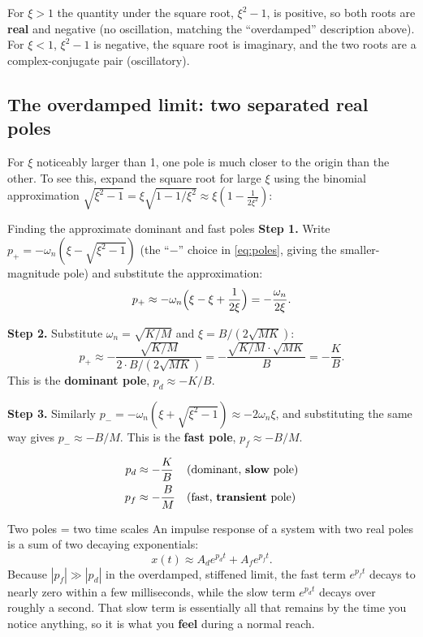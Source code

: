 \documentclass[11pt,a4paper]{article}
\begin{document}
For $\xi>1$ the quantity under the square root, $\xi^2-1$, is positive, so
both roots are \textbf{real} and negative (no oscillation, matching the
``overdamped'' description above). For $\xi<1$, $\xi^2-1$ is negative, the
square root is imaginary, and the two roots are a complex-conjugate pair
(oscillatory).

\subsection{The overdamped limit: two separated real poles}

For $\xi$ noticeably larger than 1, one pole is much closer to the origin than
the other. To see this, expand the square root for large $\xi$ using the
binomial approximation $\sqrt{\xi^2-1}=\xi\sqrt{1-1/\xi^2}\approx\xi(1-\tfrac{1}{2\xi^2})$:

\begin{stepbox}{Finding the approximate dominant and fast poles}
\textbf{Step 1.} Write $p_+ = -\omega_n(\xi-\sqrt{\xi^2-1})$ (the ``$-$''
choice in \eqref{eq:poles}, giving the smaller-magnitude pole) and substitute
the approximation:
\[
p_+ \approx -\omega_n\Bigl(\xi - \xi + \frac{1}{2\xi}\Bigr) = -\frac{\omega_n}{2\xi}.
\]

\textbf{Step 2.} Substitute $\omega_n=\sqrt{K/M}$ and $\xi=B/(2\sqrt{MK})$:
\[
p_+ \approx -\frac{\sqrt{K/M}}{2\cdot B/(2\sqrt{MK})} = -\frac{\sqrt{K/M}\cdot\sqrt{MK}}{B} = -\frac{K}{B}.
\]
This is the \textbf{dominant pole}, $p_d\approx -K/B$.

\textbf{Step 3.} Similarly $p_- = -\omega_n(\xi+\sqrt{\xi^2-1})\approx -2\omega_n\xi$,
and substituting the same way gives $p_-\approx -B/M$. This is the
\textbf{fast pole}, $p_f\approx -B/M$.
\end{stepbox}

\begin{align}
p_d &\approx -\frac{K}{B} &&\text{(dominant, \textbf{slow} pole)} \label{eq:pd}\\
p_f &\approx -\frac{B}{M} &&\text{(fast, \textbf{transient} pole)} \label{eq:pf}
\end{align}

\begin{examplebox}{Two poles = two time scales}
An impulse response of a system with two real poles is a sum of two decaying
exponentials:
\[
x(t) \approx A_d e^{p_d t} + A_f e^{p_f t}.
\]
Because $|p_f|\gg|p_d|$ in the overdamped, stiffened limit, the fast term
$e^{p_f t}$ decays to nearly zero within a few milliseconds, while the slow
term $e^{p_d t}$ decays over roughly a second. That slow term is essentially
all that remains by the time you notice anything, so it is what you
\textbf{feel} during a normal reach.
\end{examplebox}
\end{document}
